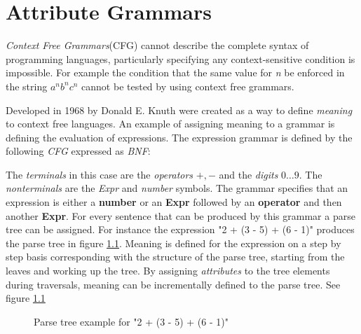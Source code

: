 \chapter{Attribute Grammars}
\label{AG}
\emph{Context Free Grammars}(CFG) cannot describe the complete syntax of programming languages\cite{knuth1}, particularly specifying any context-sensitive condition is impossible. For example the condition that the same value for \emph{n} be enforced in the string $a^nb^nc^n$ cannot be tested by using context free grammars\cite{ken}.

Developed in 1968 by Donald E. Knuth \ags were created as a way to define \emph{meaning} to context free languages. An example of assigning meaning to a grammar is defining the evaluation of expressions. The expression grammar is defined by the following \emph{CFG} expressed as \emph{BNF}:



The \emph{terminals} in this case are the \emph{operators} $+,-$ and the \emph{digits} $0\ldots 9$. The \emph{nonterminals} are the \emph{Expr} and \emph{number} symbols. The grammar specifies that an expression is either a \textbf{number} or an \textbf{Expr} followed by an \textbf{operator} and then another \textbf{Expr}. For every sentence that can be produced by this grammar a parse tree can be assigned. For instance the expression "2 + (3 - 5) + (6 - 1)" produces the parse tree in figure \ref{fig.example1.parsetree}. Meaning is defined for the expression on a step by step basis corresponding with the structure of the parse tree, starting from the leaves and working up the tree. By assigning \emph{attributes} to the tree elements during traversals, meaning can be incrementally defined to the parse tree. See figure \ref{fig.example1.parsetree}

\begin{figure}[H]
\centering
{}
\caption{Parse tree example for "2 + (3 - 5) + (6 - 1)"}
\label{fig.example1.parsetree}
\end{figure}

